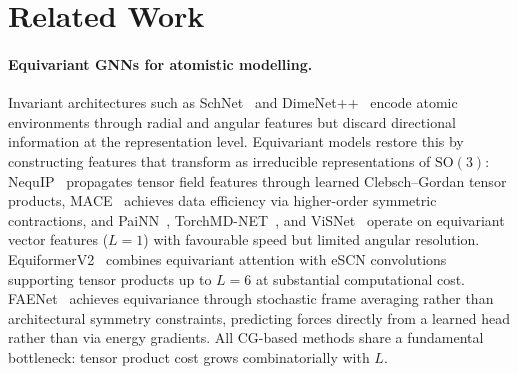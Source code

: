 \section{Related Work}\label{sec:related}

\paragraph{Equivariant GNNs for atomistic modelling.}
Invariant architectures such as SchNet~\citep{schutt2017schnet} and DimeNet++~\citep{gasteiger2020dimenetpp} encode atomic environments through radial and angular features but discard directional information at the representation level. Equivariant models restore this by constructing features that transform as irreducible representations of $\mathrm{SO}(3)$: NequIP~\citep{batzner2022nequip} propagates tensor field features through learned Clebsch--Gordan tensor products, MACE~\citep{batatia2022mace} achieves data efficiency via higher-order symmetric contractions, and PaiNN~\citep{schutt2021painn}, TorchMD-NET~\citep{tholke2022torchmdnet}, and ViSNet~\citep{wang2024visnet} operate on equivariant vector features ($L{=}1$) with favourable speed but limited angular resolution. EquiformerV2~\citep{liao2024equiformerv2} combines equivariant attention with eSCN convolutions~\citep{passaro2023escn} supporting tensor products up to $L{=}6$ at substantial computational cost. FAENet~\citep{duval2023faenet} achieves equivariance through stochastic frame averaging rather than architectural symmetry constraints, predicting forces directly from a learned head rather than via energy gradients. All CG-based methods share a fundamental bottleneck: tensor product cost grows combinatorially with $L$.

